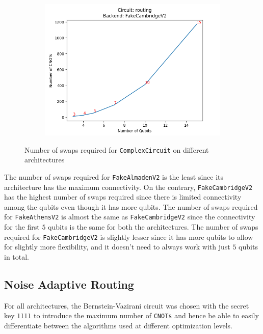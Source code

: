 \documentclass[11pt]{article}
\begin{document}
\begin{figure}[hbtp]
\begin{subfigure}{0.5\linewidth}
        \centering
        \includegraphics[width=\linewidth]{outputs/routing_FakeCambridgeV2.png}
    \end{subfigure}
    \caption{Number of swaps required for \texttt{ComplexCircuit} on different architectures}
    \label{fig:routing}
\end{figure}

The number of swaps required for \texttt{FakeAlmadenV2} is the least since its architecture has the maximum connectivity. On the contrary, \texttt{FakeCambridgeV2} has the highest number of swaps required since there is limited connectivity among the qubits even though it has more qubits. The number of swaps required for \texttt{FakeAthensV2} is almost the same as \texttt{FakeCambridgeV2} since the connectivity for the first $5$ qubits is the same for both the architectures. The number of swaps required for \texttt{FakeCambridgeV2} is slightly lesser since it has more qubits to allow for slightly more flexibility, and it doesn't need to always work with just $5$ qubits in total.

\subsection{Noise Adaptive Routing}
For all architectures, the Bernstein-Vazirani circuit was chosen with the secret key $1111$ to introduce the maximum number of \texttt{CNOTs} and hence be able to easily differentiate between the algorithms used at different optimization levels.
\end{document}
